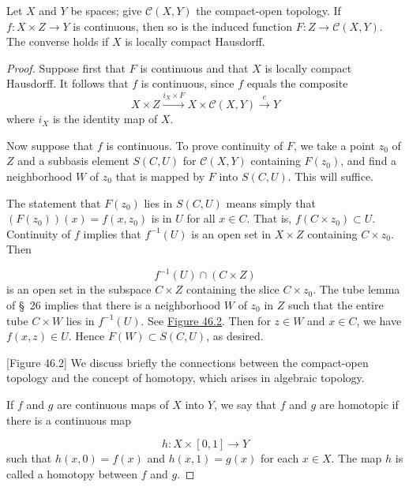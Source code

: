 \begin{theorem}
\label{thm:\thetheorem}
Let \(X\) and \(Y\) be spaces; give \(\mathcal{C}({X,Y})\) the compact-open topology. If \(f : X \times Z \rightarrow Y\) is continuous, then so is the induced function \(F : Z \rightarrow \mathcal{C}({X,Y})\). The converse holds if \(X\) is locally compact Hausdorff.
\end{theorem}

\begin{proof}
Suppose first that \(F\) is continuous and that \(X\) is locally compact Hausdorff. It follows that \(f\) is continuous, since \(f\) equals the composite
\[
X \times Z\overset{i_{X} \times F}{ \rightarrow }X \times \mathcal{C}({X,Y}) \overset{e}{ \rightarrow }Y
\]
where \(i_{X}\) is the identity map of \(X\).

Now suppose that \(f\) is continuous. To prove continuity of \(F\), we take a point \(z_{0}\) of \(Z\) and a subbasis element \(S({C,U})\) for \(\mathcal{C}({X,Y})\) containing \(F(z_{0})\), and find a neighborhood \(W\) of \(z_{0}\) that is mapped by \(F\) into \(S({C,U})\). This will suffice.

The statement that \(F(z_{0})\) lies in \(S({C,U})\) means simply that \(({F(z_{0}) }) (x) = f({x,z_{0}})\) is in \(U\) for all \(x \in C\). That is, \(f({C \times {z}_{0}}) \subset U\). Continuity of \(f\) implies that \(f^{-1}( U)\) is an open set in \(X \times Z\) containing \(C \times {z}_{0}\). Then

\[
f^{-1}( U) \cap ({C \times Z})
\]
is an open set in the subspace \(C \times Z\) containing the slice \(C \times {z}_{0}\). The tube lemma of \S\ 26 implies that there is a neighborhood \(W\) of \(z_{0}\) in \(Z\) such that the entire tube \(C \times W\) lies in \(f^{-1}( U)\). See \hyperref[fig:46.2]{Figure 46.2}. Then for \(z \in W\) and \(x \in C\), we have \(f({x,z}) \in U\). Hence \(F( W) \subset S({C,U})\), as desired.

[Figure 46.2]
We discuss briefly the connections between the compact-open topology and the concept of homotopy, which arises in algebraic topology.

If \(f\) and \(g\) are continuous maps of \(X\) into \(Y\), we say that \(f\) and \(g\) are homotopic if there is a continuous map

\[
h : X \times [ {0,1}] \rightarrow Y
\]
such that \(h({x,0}) = f(x)\) and \(h({x,1}) = g(x)\) for each \(x \in X\). The map \(h\) is called a homotopy between \(f\) and \(g\).


\end{proof}
